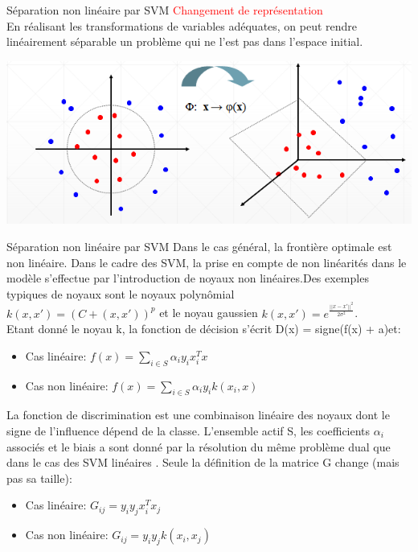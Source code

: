 \documentclass{bredelebeamer}
\begin{document}
\begin{frame}{Séparation non linéaire par SVM}
\textcolor{red}{Changement de représentation }\vspace{1\baselineskip}\\
En réalisant les transformations de variables adéquates, on peut rendre linéairement séparable un problème qui ne l’est pas dans l’espace initial.\\
     \begin{center} \includegraphics[scale=0.6]{19.png} \end{center} 
 \end{frame}

\begin{frame}{Séparation non linéaire par SVM}
Dans le cas général, la frontière optimale est non linéaire. Dans le cadre des SVM, la prise en compte de non linéarités dans le modèle s’effectue par l’introduction de noyaux non linéaires.Des exemples typiques de noyaux sont le noyaux polynômial\\
$k(x,x')=(C+(x,x'))^p$  et le noyau gaussien $k(x,x')=e^{\frac{||x-x'||^2}{2\sigma^2}}$.\\
Etant donné le noyau k, la fonction de décision s’écrit D(x) = signe(f(x) + a)et:\\
\begin{itemize}
      \item Cas linéaire:         $f(x)=\sum\limits_{i \in S} \alpha_i y_i x^{T}_i x$\\
      \item Cas non linéaire:     $f(x)=\sum\limits_{i \in S} \alpha_i y_i k(x_i,x) $\\
 \end{itemize}     
La fonction de discrimination est une combinaison linéaire des noyaux dont le signe de l’influence dépend de la classe. L’ensemble actif S, les coefficients $\alpha_i$ associés et le biais a sont donné par la résolution du même problème dual que dans le cas des SVM linéaires . Seule la définition de la matrice G change (mais pas sa taille):\vspace{1\baselineskip}\\
\begin{itemize}
      \item Cas linéaire:        $G_{ij} = y_i y_j x^{T}_i x_j$\\
      \item Cas non linéaire:    $G_{ij} = y_i y_j k(x_i,x_j)$
 \end{itemize}
 \end{frame}
 
\end{document}
